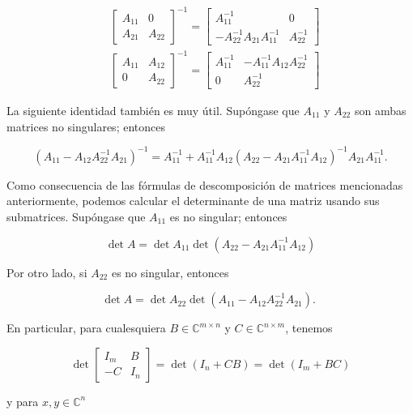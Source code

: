 \documentclass[11pt]{article}
\begin{document}
$$
\begin{aligned}
& {\left[\begin{array}{cc}
A_{11} & 0 \\
A_{21} & A_{22}
\end{array}\right]^{-1}=\left[\begin{array}{cc}
A_{11}^{-1} & 0 \\
-A_{22}^{-1} A_{21} A_{11}^{-1} & A_{22}^{-1}
\end{array}\right]} \\
& {\left[\begin{array}{cc}
A_{11} & A_{12} \\
0 & A_{22}
\end{array}\right]^{-1}=\left[\begin{array}{cc}
A_{11}^{-1} & -A_{11}^{-1} A_{12} A_{22}^{-1} \\
0 & A_{22}^{-1}
\end{array}\right]}
\end{aligned}
$$

La siguiente identidad también es muy útil. Supóngase que $A_{11}$ y $A_{22}$ son ambas matrices no singulares; entonces

$$
\left(A_{11}-A_{12} A_{22}^{-1} A_{21}\right)^{-1}=A_{11}^{-1}+A_{11}^{-1} A_{12}\left(A_{22}-A_{21} A_{11}^{-1} A_{12}\right)^{-1} A_{21} A_{11}^{-1} .
$$

Como consecuencia de las fórmulas de descomposición de matrices mencionadas anteriormente, podemos calcular el determinante de una matriz usando sus submatrices. Supóngase que $A_{11}$ es no singular; entonces

$$
\operatorname{det} A=\operatorname{det} A_{11} \operatorname{det}\left(A_{22}-A_{21} A_{11}^{-1} A_{12}\right)
$$

Por otro lado, si $A_{22}$ es no singular, entonces

$$
\operatorname{det} A=\operatorname{det} A_{22} \operatorname{det}\left(A_{11}-A_{12} A_{22}^{-1} A_{21}\right) \text {. }
$$

En particular, para cualesquiera $B \in \mathbb{C}^{m \times n}$ y $C \in \mathbb{C}^{n \times m}$, tenemos

$$
\operatorname{det}\left[\begin{array}{cc}
I_{m} & B \\
-C & I_{n}
\end{array}\right]=\operatorname{det}\left(I_{n}+C B\right)=\operatorname{det}\left(I_{m}+B C\right)
$$

y para $x, y \in \mathbb{C}^{n}$
\end{document}
